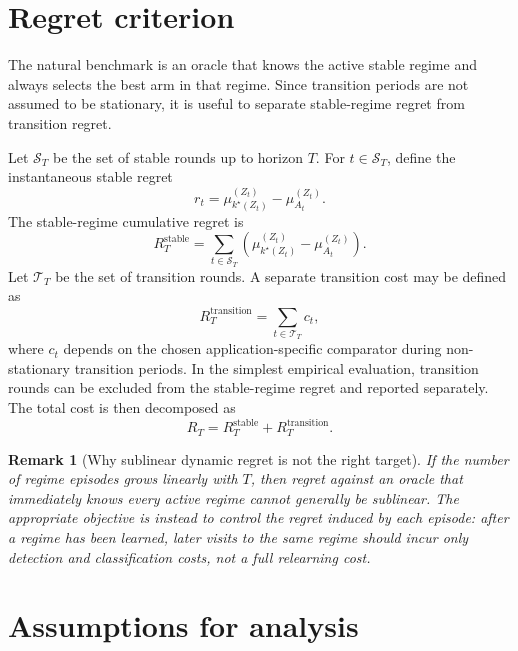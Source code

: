 \documentclass[11pt]{article}
\newtheorem{remark}{Remark}
\begin{document}
\section{Regret criterion}
\label{sec:regret}

The natural benchmark is an oracle that knows the active stable regime and always selects the best arm in that regime. Since transition periods are not assumed to be stationary, it is useful to separate stable-regime regret from transition regret.

Let $\mathcal S_T$ be the set of stable rounds up to horizon $T$. For $t\in\mathcal S_T$, define the instantaneous stable regret
\begin{equation}
\label{eq:instantaneous_regret}
r_t
=
\mu_{k^\star(Z_t)}^{(Z_t)}-\mu_{A_t}^{(Z_t)}.
\end{equation}
The stable-regime cumulative regret is
\begin{equation}
\label{eq:stable_regret}
R_T^{\mathrm{stable}}
=
\sum_{t\in\mathcal S_T}
\left(
\mu_{k^\star(Z_t)}^{(Z_t)}-\mu_{A_t}^{(Z_t)}
\right).
\end{equation}
Let $\mathcal T_T$ be the set of transition rounds. A separate transition cost may be defined as
\begin{equation}
\label{eq:transition_regret_abstract}
R_T^{\mathrm{transition}}
=
\sum_{t\in\mathcal T_T}c_t,
\end{equation}
where $c_t$ depends on the chosen application-specific comparator during non-stationary transition periods. In the simplest empirical evaluation, transition rounds can be excluded from the stable-regime regret and reported separately. The total cost is then decomposed as
\begin{equation}
\label{eq:total_regret}
R_T
=
R_T^{\mathrm{stable}}+R_T^{\mathrm{transition}}.
\end{equation}

\begin{remark}[Why sublinear dynamic regret is not the right target]
If the number of regime episodes grows linearly with $T$, then regret against an oracle that immediately knows every active regime cannot generally be sublinear. The appropriate objective is instead to control the regret induced by each episode: after a regime has been learned, later visits to the same regime should incur only detection and classification costs, not a full relearning cost.
\end{remark}

\section{Assumptions for analysis}
\label{sec:assumptions}
\end{document}

